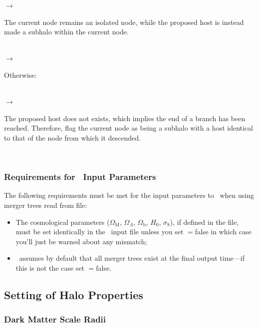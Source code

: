 \begin{itemize}
\noindent\hspace{30mm} $\rightarrow$ \parbox[t]{125mm}{The current node remains an isolated node, while the proposed host is instead made a subhalo within the current node.}\\

\noindent\hspace{20mm} $\rightarrow$ \parbox[t]{135mm}{Otherwise:}\\

\noindent\hspace{25mm} $\rightarrow$ \parbox[t]{130mm}{The proposed host does not exists, which implies the end of a branch has been reached. Therefore, flag the current node as being a subhalo with a host identical to that of the node from which it descended.}\\
\end{itemize}

\subsubsection{Requirements for \glc\ Input Parameters}

The following requirements must be met for the input parameters to \glc\ when using merger trees read from file:
\begin{itemize}
 \item The cosmological parameters ($\Omega_{\mathrm M}$, $\Omega_\Lambda$, $\Omega_{\mathrm b}$, $H_0$, $\sigma_8$), if defined in the file, must be set identically in the \glc\ input file unless you set {\normalfont \ttfamily [mergerTreeReadMismatchIsFatal]}$=${\normalfont \ttfamily false} in which case you'll just be warned about any mismatch;
 \item \glc\ assumes by default that all merger trees exist at the final output time---if this is not the case set {\normalfont \ttfamily [allTreesExistAtFinalTime]}$=${\normalfont \ttfamily false}.
\end{itemize}

\subsection{Setting of Halo Properties}

\subsubsection{Dark Matter Scale Radii}

